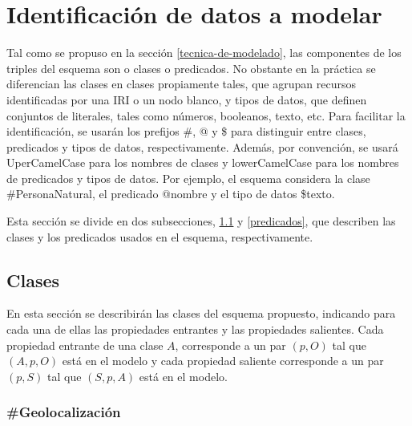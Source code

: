 \documentclass[letterpaper,titlepage]{article}
\begin{document}
\section{Identificación de datos a modelar}

Tal como se propuso en la sección \ref{tecnica-de-modelado}, las
componentes de los triples del esquema son o clases o predicados. No
obstante en la práctica se diferencian las clases en clases
propiamente tales, que agrupan recursos identificadas por una IRI o un
nodo blanco, y tipos de datos, que definen conjuntos de literales,
tales como números, booleanos, texto, etc. Para facilitar la
identificación, se usarán los prefijos \#, @ y \$ para distinguir
entre clases, predicados y tipos de datos, respectivamente. Además,
por convención, se usará UperCamelCase para los nombres de clases y
lowerCamelCase para los nombres de predicados y tipos de datos. Por
ejemplo, el esquema considera la clase \#PersonaNatural, el predicado
@nombre y el tipo de datos \$texto.

Esta sección se divide en dos subsecciones, \ref{clases} y
\ref{predicados}, que describen las clases y los predicados usados en
el esquema, respectivamente.

\subsection{Clases}
\label{clases}

En esta sección se describirán las clases del esquema
propuesto, indicando para cada una de ellas las propiedades entrantes
y las propiedades salientes. Cada propiedad entrante de una clase $A$,
corresponde a un par $(p,O)$ tal que $(A,p,O)$ está en el modelo y
cada propiedad saliente corresponde a un par $(p,S)$ tal que $(S,p,A)$
está en el modelo.







\subsubsection{\#Geolocalización}

\begin{description}
  
\end{description}



















\end{document}
